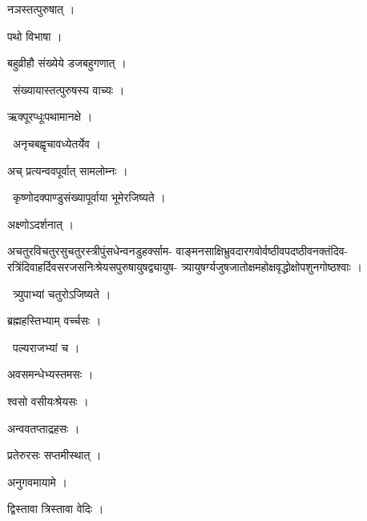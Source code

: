 \documentclass[10pt, openany, oneside]{book}
\begin{document}
\noindent नञस्तत्पुरुषात् ।

\noindent पथो विभाषा ।

\noindent बहुव्रीहौ संख्येये डजबहुगणात् ।

\par\noindent\hspace{1.5em}{\vps वा॰}~{\qt संख्यायास्तत्पुरुषस्य वाच्यः ।}

\noindent ऋक्पूरप्धूःपथामानक्षे ।

\par\noindent\hspace{1.5em}{\vps वा॰}~{\qt अनृचबह्वृचावध्येतर्येव ।}

\noindent अच् प्रत्यन्ववपूर्वात् सामलोम्नः ।

\par\noindent\hspace{1.5em}{\vps वा॰}~{\qt कृष्णोदक्पाण्डुसंख्यापूर्वाया भूमेरजिष्यते ।}

\noindent अक्ष्णोऽदर्शनात् ।

\noindent अचतुरविचतुरसुचतुरस्त्रीपुंसधेन्वनडुहर्क्साम- वाङ्मनसाक्षिभ्रुवदारगवोर्वष्ठीवपदष्ठीवनक्तंदिव- रत्रिंदिवाहर्दिवसरजसनिःश्रेयसपुरुषायुषद्व्यायुष- त्र्यायुषर्ग्यजुषजातोक्षमहोक्षवृद्धोक्षोपशुनगोष्ठश्वाः ।

\par\noindent\hspace{1.5em}{\vps वा॰}~{\qt त्र्युपाभ्यां चतुरोऽजिष्यते ।}

\noindent ब्रह्महस्तिभ्याम् वर्च्चसः ।

\par\noindent\hspace{1.5em}{\vps वा॰}~{\qt पल्यराजभ्यां च ।}

\noindent अवसमन्धेभ्यस्तमसः ।

\noindent श्वसो वसीयःश्रेयसः ।

\noindent अन्ववतप्ताद्रहसः ।

\noindent प्रतेरुरसः सप्तमीस्थात् ।

\noindent अनुगवमायामे ।

\noindent द्विस्तावा त्रिस्तावा वेदिः ।
\end{document}
